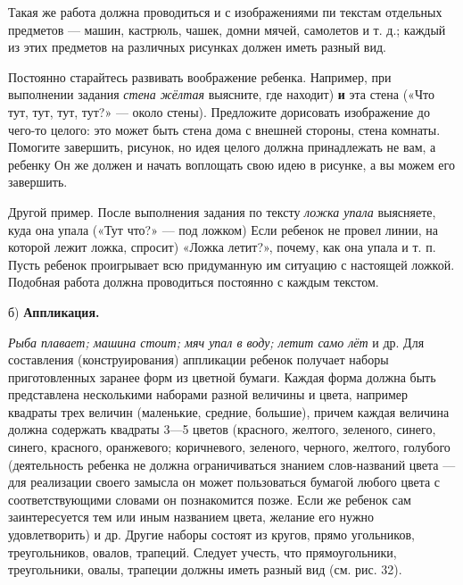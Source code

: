 \documentclass[a5paper]{book}
\renewcommand{\emph}[1]{\textit{#1}}
\begin{document}
Такая же работа должна проводиться и с изображениями пи текстам
отдельных предметов --- машин, кастрюль, чашек, домни мячей, самолетов и
т. д.; каждый из этих предметов на различных рисунках должен иметь
разный вид.

Постоянно старайтесь развивать воображение ребенка. Например, при
выполнении задания \emph{стена жёлтая} выясните, где находит) \textbf{и}
эта стена («Что тут, тут, тут, тут?» --- около стены). Предложите
дорисовать изображение до чего-то целого: это может быть стена дома с
внешней стороны, стена комнаты. Помогите завершить, рисунок, но идея
целого должна принадлежать не вам, а ребенку Он же должен и начать
воплощать свою идею в рисунке, а вы можем его завершить.

Другой пример. После выполнения задания по тексту \emph{ложка упала}
выясняете, куда она упала («Тут что?» --- под ложком) Если ребенок не
провел линии, на которой лежит ложка, спросит) «Ложка летит?», почему,
как она упала и т. п. Пусть ребенок проигрывает всю придуманную им
ситуацию с настоящей ложкой. Подобная работа должна проводиться
постоянно с каждым текстом.

б) \textbf{Аппликация.}

\emph{Рыба плавает; машина стоит; мяч упал в воду; летит само лёт} и др.
Для составления (конструирования) аппликации ребенок получает наборы
приготовленных заранее форм из цветной бумаги. Каждая форма должна быть
представлена несколькими наборами разной величины и цвета, например
квадраты трех величин (маленькие, средние, большие), причем каждая
величина должна содержать квадраты 3---5 цветов (красного, желтого,
зеленого, синего, синего, красного, оранжевого; коричневого, зеленого,
черного, желтого, голубого (деятельность ребенка не должна
ограничиваться знанием слов-названий цвета --- для реализации своего
замысла он может пользоваться бумагой любого цвета с соответствующими
словами он познакомится позже. Если же ребенок сам заинтересуется тем
или иным названием цвета, желание его нужно удовлетворить) и др. Другие
наборы состоят из кругов, прямо угольников, треугольников, овалов,
трапеций. Следует учесть, что прямоугольники, треугольники, овалы,
трапеции должны иметь разный вид (см. рис. 32).
\end{document}
